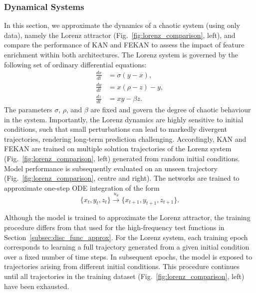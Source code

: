 \documentclass{article}
\begin{document}

\subsubsection{Dynamical Systems} %
\label{subsec:dynamical}
In this section, we approximate the dynamics of a chaotic system (using only data), namely the Lorenz attractor (Fig.~\ref{fig:lorenz_comparison}, left), and compare the performance of KAN and FEKAN to assess the impact of feature enrichment within both architectures. The Lorenz system is governed by the following set of ordinary differential equations:
\begin{align}
\label{eq:lorenz1}
\frac{dx}{dt} &= \sigma (y - x), \\
\label{eq:lorenz2}
\frac{dy}{dt} &= x(\rho - z) - y, \\
\label{eq:lorenz3}
\frac{dz}{dt} &= xy - \beta z.
\end{align}
The parameters $\sigma$, $\rho$, and $\beta$ are fixed and govern the degree of chaotic behaviour in the system. Importantly, the Lorenz dynamics are highly sensitive to initial conditions, such that small perturbations can lead to markedly divergent trajectories, rendering long-term prediction challenging. Accordingly, KAN and FEKAN are trained on multiple solution trajectories of the Lorenz system (Fig.~\ref{fig:lorenz_comparison}, left) generated from random initial conditions. Model performance is subsequently evaluated on an unseen trajectory (Fig.~\ref{fig:lorenz_comparison}, centre and right). The networks are trained to approximate one-step ODE integration of the form
\begin{equation}
\{x_t, y_t, z_t\} \xrightarrow{u_{\theta}} \{x_{t+1}, y_{t+1}, z_{t+1}\}.
\end{equation}

Although the model is trained to approximate the Lorenz attractor, the training procedure differs from that used for the high-frequency test functions in Section~\ref{subsec:disc_func_approx}. For the Lorenz system, each training epoch corresponds to learning a full trajectory generated from a given initial condition over a fixed number of time steps. In subsequent epochs, the model is exposed to trajectories arising from different initial conditions. This procedure continues until all trajectories in the training dataset (Fig.~\ref{fig:lorenz_comparison}, left) have been exhausted.
\end{document}
